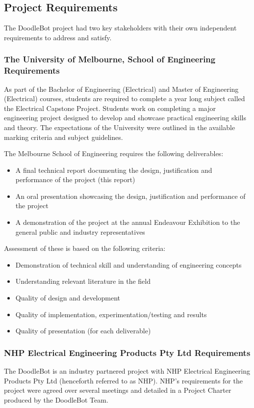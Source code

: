 \subsection{Project Requirements}

The DoodleBot project had two key stakeholders with their own independent requirements to address and satisfy.

\subsubsection{The University of Melbourne, School of Engineering Requirements}
As part of the Bachelor of Engineering (Electrical) and Master of Engineering (Electrical) courses, students are required to complete a year long subject called the Electrical Capstone Project. Students work on completing a major engineering project designed to develop and showcase practical engineering skills and theory. The expectations of the University were outlined in the available marking criteria and subject guidelines. 

The Melbourne School of Engineering requires the following deliverables:
	\begin{itemize}
		\item A final technical report documenting the design, justification and performance of the project (this report)
		\item An oral presentation showcasing the design, justification and performance of the project
		\item A demonstration of the project at the annual Endeavour Exhibition to the general public and industry representatives
	\end{itemize}

Assessment of these is based on the following criteria:
	\begin{itemize}
		\item Demonstration of technical skill and understanding of engineering concepts
		\item Understanding relevant literature in the field
		\item Quality of design and development
		\item Quality of implementation, experimentation/testing and results
		\item Quality of presentation (for each deliverable)
	\end{itemize}
	
\subsubsection{NHP Electrical Engineering Products Pty Ltd Requirements}
The DoodleBot is an industry partnered project with NHP Electrical Engineering Products Pty Ltd (henceforth referred to as NHP). NHP's requirements for the project were agreed over several meetings and detailed in a Project Charter produced by the DoodleBot Team.

